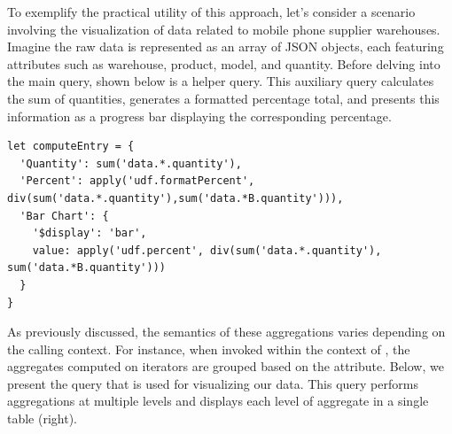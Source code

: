 \documentclass[runningheads]{llncs}
\begin{document}
To exemplify the practical utility of this approach, let's consider a scenario involving
the visualization of data related to mobile phone supplier warehouses.
Imagine the raw data is represented as an array of JSON objects, each featuring attributes
such as warehouse, product, model, and quantity.
Before delving into the main query, shown below is a helper query.
This auxiliary query calculates the sum of quantities, generates a formatted percentage
total, and presents this information as a progress bar displaying the corresponding percentage.

\begin{lstlisting}[style=JavaScript,columns=flexible]
let computeEntry = {
  'Quantity': sum('data.*.quantity'),
  'Percent': apply('udf.formatPercent', div(sum('data.*.quantity'),sum('data.*B.quantity'))),
  'Bar Chart': {
    '$display': 'bar',
    value: apply('udf.percent', div(sum('data.*.quantity'), sum('data.*B.quantity')))
  }
}
\end{lstlisting}

As previously discussed, the semantics of these aggregations varies depending on the
calling context.
For instance, when invoked within the context of , the
aggregates computed on \inline{*} iterators are grouped based on the  attribute.
Below, we present the query that is used for visualizing our data.
This query performs aggregations at multiple levels and displays each level of
aggregate in a single table (right).
\end{document}

